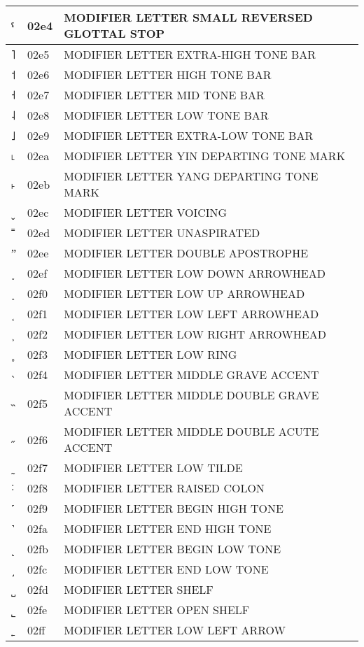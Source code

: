\documentclass[12pt,letterpaper,openany]{book}
\begin{document}
\begin{center}
\begin{supertabular}{|m{0.25in}|m{0.5in}|m{4in}|}
			ˤ & 02e4 & MODIFIER LETTER SMALL REVERSED GLOTTAL STOP\\\hline
			˥ & 02e5 & MODIFIER LETTER EXTRA-HIGH TONE BAR\\\hline
			˦ & 02e6 & MODIFIER LETTER HIGH TONE BAR\\\hline
			˧ & 02e7 & MODIFIER LETTER MID TONE BAR\\\hline
			˨ & 02e8 & MODIFIER LETTER LOW TONE BAR\\\hline
			˩ & 02e9 & MODIFIER LETTER EXTRA-LOW TONE BAR\\\hline
			˪ & 02ea & MODIFIER LETTER YIN DEPARTING TONE MARK\\\hline
			˫ & 02eb & MODIFIER LETTER YANG DEPARTING TONE MARK\\\hline
			ˬ & 02ec & MODIFIER LETTER VOICING\\\hline
			˭ & 02ed & MODIFIER LETTER UNASPIRATED\\\hline
			ˮ & 02ee & MODIFIER LETTER DOUBLE APOSTROPHE\\\hline
			˯ & 02ef & MODIFIER LETTER LOW DOWN ARROWHEAD\\\hline
			˰ & 02f0 & MODIFIER LETTER LOW UP ARROWHEAD\\\hline
			˱ & 02f1 & MODIFIER LETTER LOW LEFT ARROWHEAD\\\hline
			˲ & 02f2 & MODIFIER LETTER LOW RIGHT ARROWHEAD\\\hline
			˳ & 02f3 & MODIFIER LETTER LOW RING\\\hline
			˴ & 02f4 & MODIFIER LETTER MIDDLE GRAVE ACCENT\\\hline
			˵ & 02f5 & MODIFIER LETTER MIDDLE DOUBLE GRAVE ACCENT\\\hline
			˶ & 02f6 & MODIFIER LETTER MIDDLE DOUBLE ACUTE ACCENT\\\hline
			˷ & 02f7 & MODIFIER LETTER LOW TILDE\\\hline
			˸ & 02f8 & MODIFIER LETTER RAISED COLON\\\hline
			˹ & 02f9 & MODIFIER LETTER BEGIN HIGH TONE\\\hline
			˺ & 02fa & MODIFIER LETTER END HIGH TONE\\\hline
			˻ & 02fb & MODIFIER LETTER BEGIN LOW TONE\\\hline
			˼ & 02fc & MODIFIER LETTER END LOW TONE\\\hline
			˽ & 02fd & MODIFIER LETTER SHELF\\\hline
			˾ & 02fe & MODIFIER LETTER OPEN SHELF\\\hline
			˿ & 02ff & MODIFIER LETTER LOW LEFT ARROW\\\hline

\end{supertabular}
\end{center}
\end{document}

